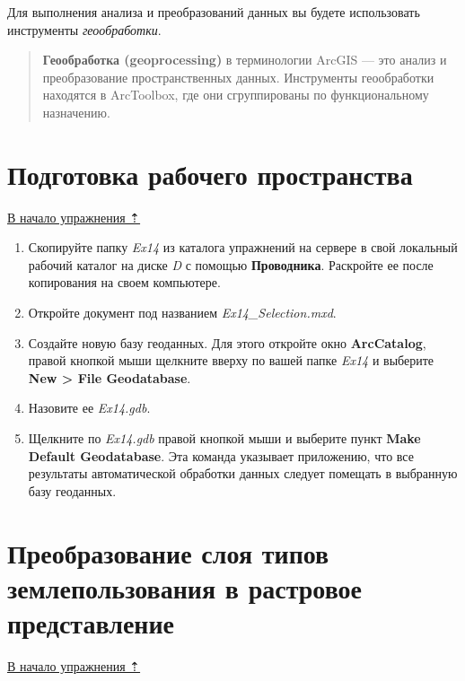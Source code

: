 \documentclass[]{book}
\theoremstyle{definition}
\theoremstyle{definition}
\theoremstyle{definition}
\theoremstyle{remark}
\begin{document}
Для выполнения анализа и преобразований данных вы будете использовать
инструменты \emph{геообработки}.

\begin{quote}
\textbf{Геообработка (geoprocessing)} в терминологии ArcGIS --- это
анализ и преобразование пространственных данных. Инструменты
геообработки находятся в ArcToolbox, где они сгруппированы по
функциональному назначению.
\end{quote}

\hypertarget{weighted-overlay-workspace}{%
\section{Подготовка рабочего
пространства}\label{weighted-overlay-workspace}}

\protect\hyperlink{weighted-overlay}{В начало упражнения ⇡}

\begin{enumerate}
\def\labelenumi{\arabic{enumi}.}
\item
  Скопируйте папку \emph{Ex14} из каталога упражнений на сервере в свой
  локальный рабочий каталог на диске \emph{D} с помощью
  \textbf{Проводника}. Раскройте ее после копирования на своем
  компьютере.
\item
  Откройте документ под названием \emph{Ex14\_Selection.mxd}.
\item
  Создайте новую базу геоданных. Для этого откройте окно
  \textbf{ArcCatalog}, правой кнопкой мыши щелкните вверху по вашей
  папке \emph{Ex14} и выберите \textbf{New \textgreater{} File
  Geodatabase}.
\item
  Назовите ее \emph{Ex14.gdb}.
\item
  Щелкните по \emph{Ex14.gdb} правой кнопкой мыши и выберите пункт
  \textbf{Make Default Geodatabase}. Эта команда указывает приложению,
  что все результаты автоматической обработки данных следует помещать в
  выбранную базу геоданных.
\end{enumerate}

\hypertarget{weighted-overlay-rasterize}{%
\section{Преобразование слоя типов землепользования в растровое
представление}\label{weighted-overlay-rasterize}}

\protect\hyperlink{ux432ux44bux431ux43eux440-ux43eux43fux442ux438ux43cux430ux43bux44cux43dux43eux433ux43e-ux43cux435ux441ux442ux43eux43fux43eux43bux43eux436ux435ux43dux438ux44f}{В
начало упражнения ⇡}
\end{document}
